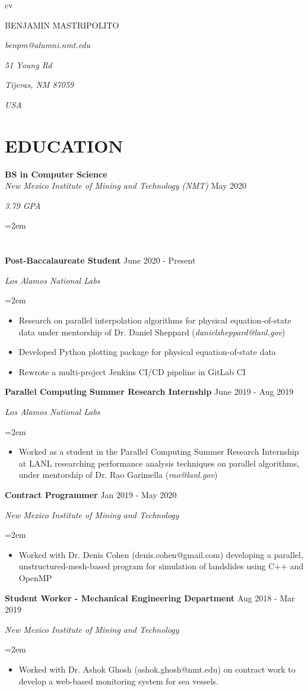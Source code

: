 \documentclass[paper=a4,fontsize=11pt]{scrartcl} %
\newcommand{\sepspace}{\vspace*{1em}}		%
\newcommand{\sym}{\raisebox{1pt}{$\blacktriangleright$}}
\newcommand{\MyName}[5]{ %
	\setlength\parskip{0cm}
	\noindent
	\begin{minipage}[c]{ 4.1cm }
		\begin{tcolorbox}[colback=yel,colframe=yel,halign title=left,boxsep=0mm,left=2mm,flush left]
			\color{blk}
			\fontsize{90pt}{90pt}\selectfont \usefont{OT1}{phv}{b}{n} cv
		\end{tcolorbox}
	\end{minipage}
	\begin{minipage}[t]{ 10.6cm }
		\vspace{-3.2em}
		\hfill \huge \usefont{OT1}{phv}{b}{n} #1
		\par \hfill \large \usefont{OT1}{phv}{m}{n} \textit{#2} %
		\par \hfill \small \usefont{OT1}{phv}{m}{n} \textit{#3} %
		\par \hfill \small \usefont{OT1}{phv}{m}{n} \textit{#4} %
		\par \hfill \small \usefont{OT1}{phv}{m}{n} \textit{#5} %
	\end{minipage}
	\par \normalsize \normalfont
}
\newcommand{\NewPart}[1]{\section*{\sym \mbox{} \MakeUppercase{#1}}}
\newcommand{\EducationEntry}[5]{
		\Large \noindent \textbf{#1} \hfill \\   %
		\normalsize \noindent \textit{#2} \hfill	  %
		\colorbox{yel}{\color{blk}#3} \par  %
		\noindent \textit{#4} \par        %
		\noindent\hangindent=2em\hangafter=0 \small #5 %
		\normalsize \par
		\sepspace}
\newcommand{\WorkEntry}[4]{				  %
		\noindent \textbf{#1} \hfill      %
		\colorbox{yel}{\color{blk}#2} \par  %
		\noindent \textit{#3} \par              %
		\noindent\hangindent=2em\hangafter=0 \small #4 %
		\normalsize \par
		\sepspace}
\begin{document}
\MyName{BENJAMIN MASTRIPOLITO}{benpm@alumni.nmt.edu}{51 Young Rd}{Tijeras, NM 87059}{USA}

\sepspace


\NewPart{Education}{}

\EducationEntry{BS in Computer Science}{New Mexico Institute of Mining and Technology (NMT)}{May 2020}{3.79 GPA}


\NewPart{Work Experience}{}

\WorkEntry{Post-Baccalaureate Student}
	{June 2020 - Present}{Los Alamos National Labs}{\noindent
	\begin{itemize}
		\item Research on parallel interpolation algorithms for physical equation-of-state data
			under mentorship of Dr. Daniel Sheppard (\textit{danielsheppard@lanl.gov})
		\item Developed Python plotting package for physical equation-of-state data
		\item Rewrote a multi-project Jenkins CI/CD pipeline in GitLab CI
	\end{itemize}
}

\WorkEntry{Parallel Computing Summer Research Internship}
	{June 2019 - Aug 2019}{Los Alamos National Labs}{\noindent
	\begin{itemize}
		\item Worked as a student in the Parallel Computing Summer Research Internship at LANL researching performance
			analysis techniques on parallel algorithms, under mentorship of Dr. Rao Garimella (\textit{rao@lanl.gov})
	\end{itemize}	
}

\WorkEntry{Contract Programmer}
	{Jan 2019 - May 2020}{New Mexico Institute of Mining and Technology}{\noindent
	\begin{itemize}
		\item Worked with Dr. Denis Cohen (denis.cohen@gmail.com) developing a parallel, unstructured-mesh-based program for
			simulation of landslides using C++ and OpenMP
	\end{itemize}
}

\WorkEntry{Student Worker - Mechanical Engineering Department}
	{Aug 2018 - Mar 2019}{New Mexico Institute of Mining and Technology}{\noindent
	\begin{itemize}
		\item Worked with Dr. Ashok Ghosh (ashok.ghosh@nmt.edu) on contract work to develop a web-based monitoring
			system for sea vessels.
	\end{itemize}
}
\end{document}
